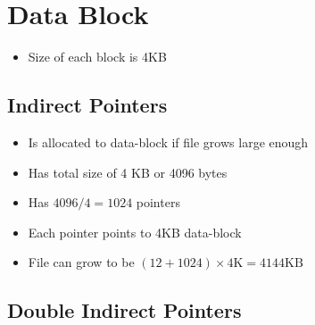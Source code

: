 \documentclass[12pt]{article}
\begin{document}
\section{Data Block}

\begin{itemize}
    \item Size of each block is 4KB
\end{itemize}

\subsection{Indirect Pointers}

\begin{itemize}
    \item Is allocated to data-block if file grows large enough
    \item Has total size of 4 KB or 4096 bytes
    \item Has $4096/4 = 1024$ pointers
    \item Each pointer points to 4KB data-block
    \item File can grow to be $(12 + 1024) \times 4\text{K} = 4144\text{KB}$
\end{itemize}

\subsection{Double Indirect Pointers}
\end{document}
